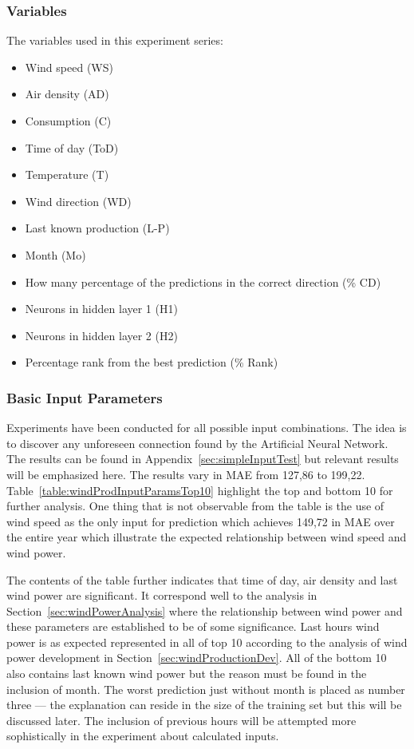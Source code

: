 \subsubsection{Variables}
The variables used in this experiment series:

\begin{itemize}
\item Wind speed (WS)
\item Air density (AD)
\item Consumption (C)
\item Time of day (ToD)
\item Temperature (T)
\item Wind direction (WD)
\item Last known production (L-P)
\item Month (Mo)
\item How many percentage of the predictions in the correct direction (\% CD)
\item Neurons in hidden layer 1 (H1)
\item Neurons in hidden layer 2 (H2)
\item Percentage rank from the best prediction (\% Rank)
\end{itemize}

\subsubsection{Basic Input Parameters}
\label{sec:predictionBasicInputParams}
Experiments have been conducted for all possible input combinations. The idea is to discover any unforeseen connection found by the Artificial Neural Network. The results can be found in Appendix~\ref{sec:simpleInputTest} but relevant results will be emphasized here. The results vary in MAE from 127,86 to 199,22. Table~\ref{table:windProdInputParamsTop10} highlight the top and bottom 10 for further analysis. One thing that is not observable from the table is the use of wind speed as the only input for prediction which achieves 149,72 in MAE over the entire year which illustrate the expected relationship between wind speed and wind power. 

The contents of the table further indicates that time of day, air density and last wind power are significant. It correspond well to the analysis in Section~\ref{sec:windPowerAnalysis} where the relationship between wind power and these parameters are established to be of some significance. Last hours wind power is as expected represented in all of top 10 according to the analysis of wind power development in Section~\ref{sec:windProductionDev}. All of the bottom 10 also contains last known wind power but the reason must be found in the inclusion of month. The worst prediction just without month is placed as number three --- the explanation can reside in the size of the training set but this will be discussed later. The inclusion of previous hours will be attempted more sophistically in the experiment about calculated inputs. 

